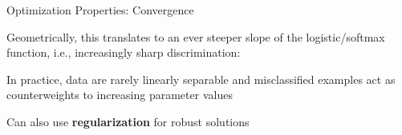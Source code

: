 \documentclass[11pt,compress,t,notes=noshow, xcolor=table]{beamer}
\begin{document}
\begin{framei}[sep=L]{Optimization Properties: Convergence}

\item
Geometrically, this translates to an ever steeper slope of the 
logistic/softmax function, i.e., increasingly sharp discrimination:

\vfill

{
}
\item In practice, data are rarely linearly separable and misclassified 
examples act as counterweights to increasing parameter values
\item Can also use \textbf{regularization} for  robust solutions

\end{framei}


\endlecture
\end{document}
